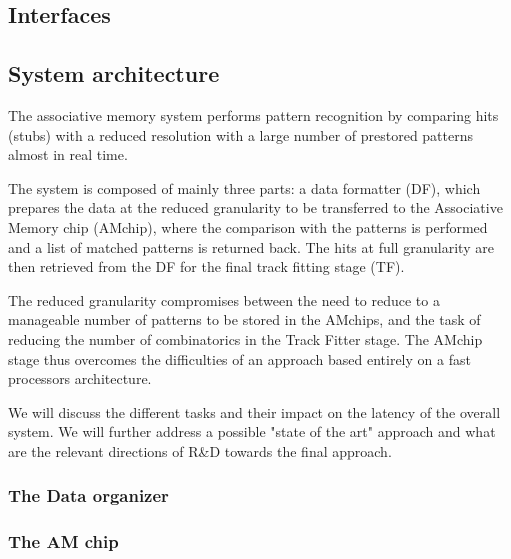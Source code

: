 \subsection{Interfaces}

\subsection{System architecture}

The associative memory system performs pattern recognition by comparing hits (stubs) with a reduced resolution with a large number
of prestored patterns almost in real time. 

The system is composed of mainly three parts: a data formatter (DF), which prepares the data at the reduced granularity to be transferred 
to the Associative Memory chip (AMchip), where the comparison with the patterns is performed and a list of matched patterns
is returned back. The hits at full granularity are then retrieved from the DF for the final track fitting stage (TF).

The reduced granularity compromises between the need to reduce to a manageable number of patterns to be stored in the AMchips, 
and the task of reducing the number of combinatorics in the Track Fitter stage. The AMchip stage thus overcomes the difficulties
of an approach based entirely on a fast processors architecture.

We will discuss the different tasks and their impact on the latency of the overall system. We will further address
a possible "state of the art" approach and what are the relevant directions of R\&D towards the final approach.


\subsubsection{The Data organizer}

\subsubsection{The AM chip}

